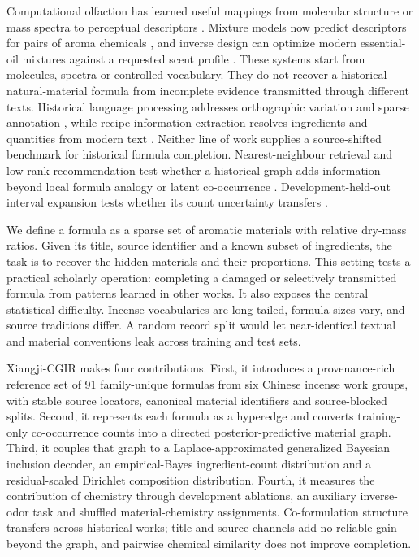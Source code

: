 \documentclass[11pt]{article}
\begin{document}
Computational olfaction has learned useful mappings from molecular structure or mass spectra to perceptual descriptors \cite{ref4,ref5,ref6,ref7,ref8}. Mixture models now predict descriptors for pairs of aroma chemicals \cite{ref9}, and inverse design can optimize modern essential-oil mixtures against a requested scent profile \cite{ref10}. These systems start from molecules, spectra or controlled vocabulary. They do not recover a historical natural-material formula from incomplete evidence transmitted through different texts. Historical language processing addresses orthographic variation and sparse annotation \cite{ref11}, while recipe information extraction resolves ingredients and quantities from modern text \cite{ref12}. Neither line of work supplies a source-shifted benchmark for historical formula completion. Nearest-neighbour retrieval and low-rank recommendation test whether a historical graph adds information beyond local formula analogy or latent co-occurrence \cite{ref16,ref17}. Development-held-out interval expansion tests whether its count uncertainty transfers \cite{ref18}.

We define a formula as a sparse set of aromatic materials with relative dry-mass ratios. Given its title, source identifier and a known subset of ingredients, the task is to recover the hidden materials and their proportions. This setting tests a practical scholarly operation: completing a damaged or selectively transmitted formula from patterns learned in other works. It also exposes the central statistical difficulty. Incense vocabularies are long-tailed, formula sizes vary, and source traditions differ. A random record split would let near-identical textual and material conventions leak across training and test sets.

Xiangji-CGIR makes four contributions. First, it introduces a provenance-rich reference set of 91 family-unique formulas from six Chinese incense work groups, with stable source locators, canonical material identifiers and source-blocked splits. Second, it represents each formula as a hyperedge and converts training-only co-occurrence counts into a directed posterior-predictive material graph. Third, it couples that graph to a Laplace-approximated generalized Bayesian inclusion decoder, an empirical-Bayes ingredient-count distribution and a residual-scaled Dirichlet composition distribution. Fourth, it measures the contribution of chemistry through development ablations, an auxiliary inverse-odor task and shuffled material-chemistry assignments. Co-formulation structure transfers across historical works; title and source channels add no reliable gain beyond the graph, and pairwise chemical similarity does not improve completion.
\end{document}
